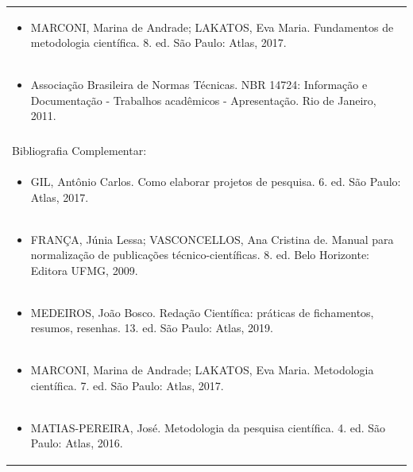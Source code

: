 \documentclass[11pt]{article}
\begin{document}
\begin{center}
\begin{longtable}{|p{4cm}|p{4cm}|p{4cm}|p{4cm}|}
\multicolumn{4}{|p{\dimexpr 16cm + 6\tabcolsep\relax}|}{\begin{itemize}\item MARCONI, Marina de Andrade; LAKATOS, Eva Maria. Fundamentos de metodologia científica. 8. ed. São Paulo: Atlas, 2017.\end{itemize}}\\
\multicolumn{4}{|p{\dimexpr 16cm + 6\tabcolsep\relax}|}{\begin{itemize}\item Associação Brasileira de Normas Técnicas. NBR 14724: Informação e Documentação - Trabalhos acadêmicos - Apresentação. Rio de Janeiro, 2011.\end{itemize}}\\
\multicolumn{4}{|p{16cm}|}{}\\
\hline
\multicolumn{4}{|p{16cm}|}{Bibliografia Complementar:}\\*
\multicolumn{4}{|p{\dimexpr 16cm + 6\tabcolsep\relax}|}{\begin{itemize}\item GIL, Antônio Carlos. Como elaborar projetos de pesquisa. 6. ed. São Paulo: Atlas, 2017.\end{itemize}}\\
\multicolumn{4}{|p{\dimexpr 16cm + 6\tabcolsep\relax}|}{\begin{itemize}\item FRANÇA, Júnia Lessa; VASCONCELLOS, Ana Cristina de. Manual para normalização de publicações técnico-científicas. 8. ed. Belo Horizonte: Editora UFMG, 2009.\end{itemize}}\\
\multicolumn{4}{|p{\dimexpr 16cm + 6\tabcolsep\relax}|}{\begin{itemize}\item MEDEIROS, João Bosco. Redação Científica: práticas de fichamentos, resumos, resenhas. 13. ed. São Paulo: Atlas, 2019.\end{itemize}}\\
\multicolumn{4}{|p{\dimexpr 16cm + 6\tabcolsep\relax}|}{\begin{itemize}\item MARCONI, Marina de Andrade; LAKATOS, Eva Maria. Metodologia científica. 7. ed. São Paulo: Atlas, 2017.\end{itemize}}\\
\multicolumn{4}{|p{\dimexpr 16cm + 6\tabcolsep\relax}|}{\begin{itemize}\item MATIAS-PEREIRA, José. Metodologia da pesquisa científica. 4. ed. São Paulo: Atlas, 2016.\end{itemize}}\\

\end{longtable}
\end{center}
\end{document}
